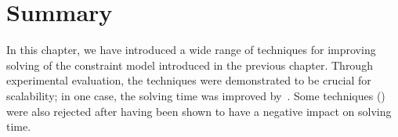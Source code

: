 \section{Summary}

In this chapter, we have introduced a wide range of techniques for improving
solving of the \gls{constraint model} introduced in the previous chapter.
%
Through experimental evaluation, the techniques were demonstrated to be crucial
for scalability; in one case, the solving time was improved
by~\printMaxSpeedup{%
  \SolvTechEnableOnlyAllGoodPrePlusSolvingTimeSpeedupPrePlusSolvingTimeZeroCenteredSpeedupMax,
  \SolvTechDisableAllBadPrePlusSolvingTimeSpeedupPrePlusSolvingTimeZeroCenteredSpeedupMax,
  \SolvTechDisableAllPrePlusSolvingTimeSpeedupPrePlusSolvingTimeZeroCenteredSpeedupMax
}.
%
Some techniques () were also rejected after having been shown to have
a negative impact on solving time.
